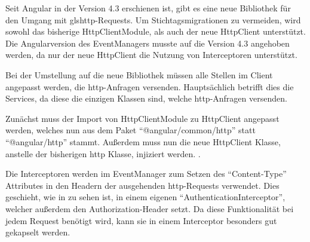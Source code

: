 
Seit Angular in der Version 4.3 erschienen ist, gibt es eine neue Bibliothek für den
Umgang mit gls{http}-Requests. Um Stichtagsmigrationen zu vermeiden, wird sowohl das bisherige HttpClientModule, als auch der neue HttpClient unterstützt.
Die Angularversion des EventManagers musste auf die Version 4.3 angehoben werden, da nur der neue HttpClient die Nutzung von Interceptoren unterstützt.


Bei der Umstellung auf die neue Bibliothek müssen alle Stellen im Client angepasst werden, die \gls{http}-Anfragen versenden.
Hauptsächlich betrifft dies die Services, da diese die einzigen Klassen sind, welche \gls{http}-Anfragen versenden.

Zunächst muss der Import von HttpClientModule zu HttpClient angepasst werden, welches nun aus dem Paket \enquote{@angular/common/http} statt \enquote{@angular/http} stammt.
Außerdem muss nun die neue HttpClient Klasse, anstelle der bisherigen http Klasse, injiziert werden.
\cite{httpClient} \cite{httpInter}.

 \label{authInterceptor}
Die Interceptoren werden im EventManager zum Setzen des \enquote{Content-Type} Attributes in den Headern der ausgehenden \gls{http}-Requests verwendet.
Dies geschieht, wie in  zu sehen ist, in einem eigenen \enquote{AuthenticationInterceptor}, welcher außerdem den Authorization-Header setzt. Da diese Funktionalität bei jedem Request benötigt wird, kann sie in einem Interceptor besonders gut gekapselt werden.


